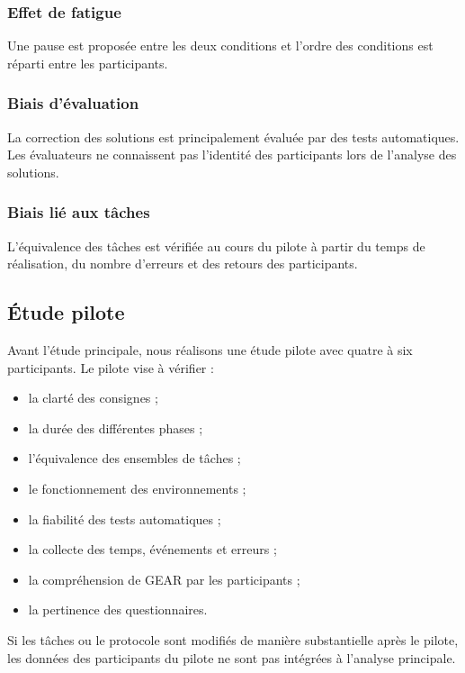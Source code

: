 \subsubsection{Effet de fatigue}

Une pause est proposée entre les deux conditions et l'ordre des
conditions est réparti entre les participants.


\subsubsection{Biais d'évaluation}

La correction des solutions est principalement évaluée par des tests
automatiques. Les évaluateurs ne connaissent pas l'identité des
participants lors de l'analyse des solutions.


\subsubsection{Biais lié aux tâches}

L'équivalence des tâches est vérifiée au cours du pilote à partir du
temps de réalisation, du nombre d'erreurs et des retours des
participants.


\subsection{Étude pilote}
\label{subsec:etude-pilote}

Avant l'étude principale, nous réalisons une étude pilote avec quatre à
six participants. Le pilote vise à vérifier :

\begin{itemize}
    \item la clarté des consignes ;
    \item la durée des différentes phases ;
    \item l'équivalence des ensembles de tâches ;
    \item le fonctionnement des environnements ;
    \item la fiabilité des tests automatiques ;
    \item la collecte des temps, événements et erreurs ;
    \item la compréhension de GEAR par les participants ;
    \item la pertinence des questionnaires.
\end{itemize}

Si les tâches ou le protocole sont modifiés de manière substantielle
après le pilote, les données des participants du pilote ne sont pas
intégrées à l'analyse principale.


